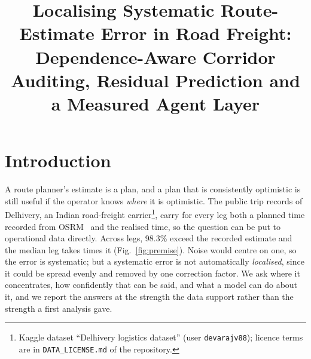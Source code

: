 \documentclass[pdflatex,sn-basic]{sn-jnl}
\makeatletter
\newcommand{\mentorgiven}{Anshi}
\newcommand{\mentorsurname}{Bajaj}
\newcommand{\mentoremail}{anshi.bajaj@nmims.edu}
\makeatother
\begin{document}
\title[Localising Route-Estimate Error in Road Freight]{Localising Systematic Route-Estimate Error in Road Freight: Dependence-Aware Corridor Auditing, Residual Prediction and a Measured Agent Layer}

\author*[1]{ }

\author[1]{ }

\author[1]{ }

\author[1]{\fnm{\mentorgiven} \sur{\mentorsurname}}\email{\mentoremail}


\abstract{}


\maketitle

\section{Introduction}\label{sec:intro}
A route planner's estimate is a plan, and a plan that is consistently optimistic is still useful if the operator knows \emph{where} it is optimistic. The public trip records of Delhivery, an Indian road-freight carrier\footnote{Kaggle dataset ``Delhivery logistics dataset'' (user \texttt{devarajv88}); licence terms are in \texttt{DATA\_LICENSE.md} of the repository.}, carry for every leg both a planned time recorded from OSRM~\cite{luxen2011real} and the realised time, so the question can be put to operational data directly. Across \fzLegsTotal{} legs, 98.3\% exceed the recorded estimate and the median leg takes \fzMedianGapRatioDpOne{} times it (Fig.~\ref{fig:premise}). Noise would centre on one, so the error is systematic; but a systematic error is not automatically \emph{localised}, since it could be spread evenly and removed by one correction factor. We ask where it concentrates, how confidently that can be said, and what a model can do about it, and we report the answers at the strength the data support rather than the strength a first analysis gave.
\end{document}
